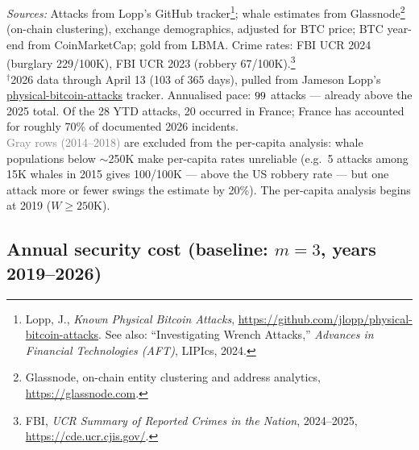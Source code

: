 \documentclass[a4paper,11pt]{article}
\def\UnderMult{3}        %
\def\aXXVIytd{28}     %
\def\daysXXVI{103}    %
\edef\aXXVIann{\fpeval{\aXXVIytd * 365 / \daysXXVI}}
\begin{document}
{\footnotesize \textit{Sources:} Attacks from Lopp's GitHub tracker\footnote{Lopp, J., \textit{Known Physical Bitcoin Attacks}, \url{https://github.com/jlopp/physical-bitcoin-attacks}. See also: ``Investigating Wrench Attacks,'' \textit{Advances in Financial Technologies (AFT)}, LIPIcs, 2024.}; whale estimates from Glassnode\footnote{Glassnode, on-chain entity clustering and address analytics, \url{https://glassnode.com}.} (on-chain clustering), exchange demographics, adjusted for BTC price; BTC year-end from CoinMarketCap; gold from LBMA. Crime rates: FBI UCR 2024 (burglary 229/100K), FBI UCR 2023 (robbery 67/100K).\footnote{FBI, \textit{UCR Summary of Reported Crimes in the Nation}, 2024--2025, \url{https://cde.ucr.cjis.gov/}.}\\[3pt]
$^{\dagger}$2026 data through April 13 (103 of 365 days), pulled from Jameson Lopp's \href{https://github.com/jlopp/physical-bitcoin-attacks}{physical-bitcoin-attacks} tracker. Annualised pace: $\fpeval{round(\aXXVIann, 0)}$ attacks --- already above the 2025 total. Of the \aXXVIytd{} YTD attacks, 20 occurred in France; France has accounted for roughly 70\% of documented 2026 incidents.\\[3pt]
\textcolor{graytext}{Gray rows (2014--2018)} are excluded from the per-capita analysis: whale populations below $\sim$250K make per-capita rates unreliable (e.g.\ 5 attacks among 15K whales in 2015 gives 100/100K --- above the US robbery rate --- but one attack more or fewer swings the estimate by 20\%). The per-capita analysis begins at 2019 ($W \geq 250$K).}

\subsection{Annual security cost (baseline: $m = \UnderMult$, years 2019--2026)}
\end{document}
